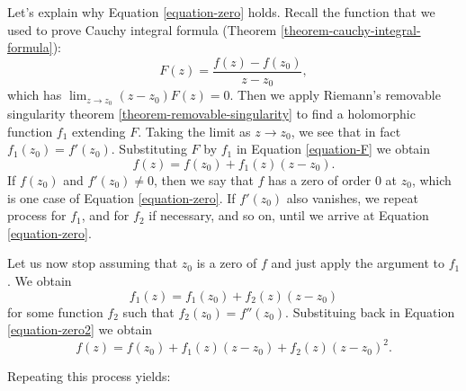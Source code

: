 \medskip\noindent
Let's explain why Equation \ref{equation-zero} holds.
Recall the function that we used to prove Cauchy integral formula
(Theorem \ref{theorem-cauchy-integral-formula}):
\begin{equation}
\label{equation-F}
F(z)=\frac{f(z)-f(z_0)}{z-z_0},
\end{equation}
which has $\lim_{z\to z_0} (z-z_0)F(z)=0$. Then we apply
Riemann's removable singularity theorem \ref{theorem-removable-singularity}
to find a holomorphic function $f_1$ extending $F$.
Taking the limit as $z \to z_0$, we see that in fact
$f_1(z_0)=f'(z_0)$.
Substituting $F$ by $f_1$
in Equation \ref{equation-F} we obtain
\begin{equation}
\label{equation-zero2}
f(z)=f(z_0)+f_1(z)(z-z_0).
\end{equation}
If $f(z_0)$ and $f'(z_0)\neq 0$, then we say that $f$ has
a zero of order 0 at $z_0$, which is one case of
Equation \ref{equation-zero}. If  $f'(z_0)$ also vanishes,
we repeat process for $f_1$, and for $f_2$ if necessary, and so on, 
until we arrive at Equation \ref{equation-zero}.

Let us now stop assuming that $z_0$ is a zero of $f$ 
and just apply the argument to $f_1$. We obtain
$$
f_1(z)=f_1(z_0)+f_2(z)(z-z_0)
$$
for some function $f_2$ such that $f_2(z_0)=f''(z_0)$.
Substituing back in Equation \ref{equation-zero2} we obtain
$$
f(z)=f(z_0)+f_1(z)(z-z_0)+f_2(z)(z-z_0)^2.
$$

Repeating this process yields:

